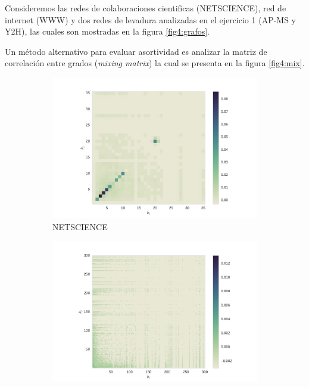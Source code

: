 Consideremos las redes de colaboraciones cientificas (NETSCIENCE), red de internet (WWW) y dos redes de levadura analizadas 
en el ejercicio 1 (AP-MS y Y2H), las cuales son mostradas en la figura \ref{fig4:grafos}.


Un m\'etodo alternativo para 
evaluar asortividad es analizar la matriz de correlaci\'on entre grados (\textit{mixing matrix}) la cual se presenta en
la figura \ref{fig4:mix}.


\begin{figure}[!ht]
    \centering
    \begin{subfigure}[b]{0.45\columnwidth}
        \includegraphics[width=\textwidth]{./schemes/mixing_netscience-gml.pdf}
        \caption{\label{fig4:NETSCIENCE}NETSCIENCE}
    \end{subfigure}
    \begin{subfigure}[b]{0.45\columnwidth}
        \includegraphics[width=\textwidth]{./schemes/mixing_as-22july06-gml.pdf}

\end{subfigure}
\end{figure}

